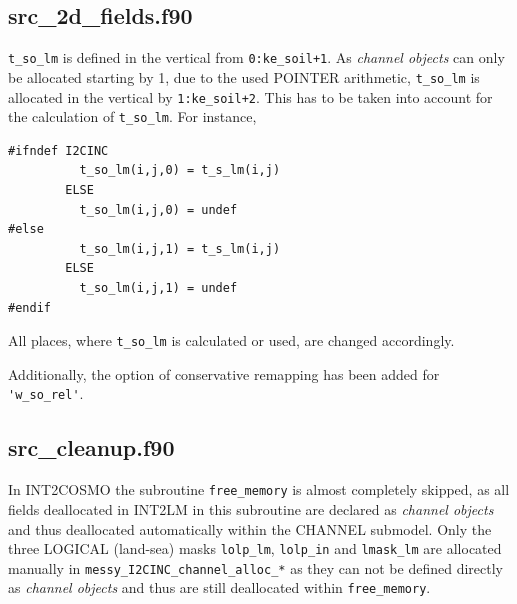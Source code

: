 \documentclass[11pt,twoside]{article}
\begin{document}
\subsection{src\_2d\_fields.f90}
\verb|t_so_lm| is defined in the vertical from \verb|0:ke_soil+1|. As {\it 
channel objects} can only be allocated starting by 1, due to the used 
{\footnotesize POINTER} arithmetic, \verb|t_so_lm| is allocated in the vertical
by \verb|1:ke_soil+2|. This has to be taken into account for the calculation
of \verb|t_so_lm|. For instance,
\begin{verbatim}
#ifndef I2CINC
          t_so_lm(i,j,0) = t_s_lm(i,j)
        ELSE
          t_so_lm(i,j,0) = undef
#else
          t_so_lm(i,j,1) = t_s_lm(i,j)
        ELSE
          t_so_lm(i,j,1) = undef
#endif
\end{verbatim}
All places, where \verb|t_so_lm| is calculated or used, are changed 
accordingly.

Additionally, the option of conservative remapping has been added for 
\verb|'w_so_rel'|.

\subsection{src\_cleanup.f90}
In INT2COSMO the subroutine \verb|free_memory| is almost completely skipped, 
as all fields deallocated in INT2LM in this subroutine are declared as 
{\it channel objects} and thus
deallocated automatically within the CHANNEL submodel. Only the three 
{\footnotesize LOGICAL} (land-sea) masks
\verb|lolp_lm|, \verb|lolp_in| and \verb|lmask_lm| 
are allocated manually in \verb|messy_I2CINC_channel_alloc_*| as they
 can not be defined directly as {\it channel objects} and thus are still 
 deallocated within \verb|free_memory|. 
\end{document}
